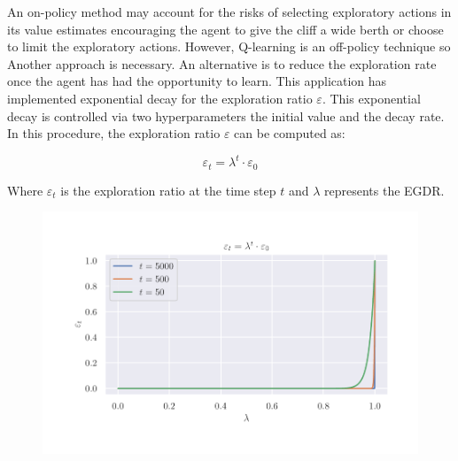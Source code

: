 \documentclass[]{final_report}
\begin{document}
An on-policy method may account for the risks of selecting exploratory actions in its value estimates encouraging the agent to give the cliff a wide berth or choose to limit the exploratory actions. However, Q-learning is an off-policy technique so Another approach is necessary. An alternative is to reduce the exploration rate once the agent has had the opportunity to learn. This application has implemented exponential decay for the exploration ratio $\varepsilon$. This exponential decay is controlled via two hyperparameters the initial value and the decay rate. In this procedure, the exploration ratio $\varepsilon$ can be computed as: 

\begin{equation}
  \varepsilon_t = \lambda^t \cdot \varepsilon_0
\end{equation}

Where $\varepsilon_t$ is the exploration ratio at the time step $t$ and $\lambda$ represents the EGDR.

  
  

\begin{figure}[H]
  \centering
  
  \includegraphics[trim={0 1cm 0 1cm},clip, width=\textwidth]{hyper-paramiters/example-curve.pdf}
  
  \caption{\label{fig:example-curve}}
\end{figure}
\end{document}

